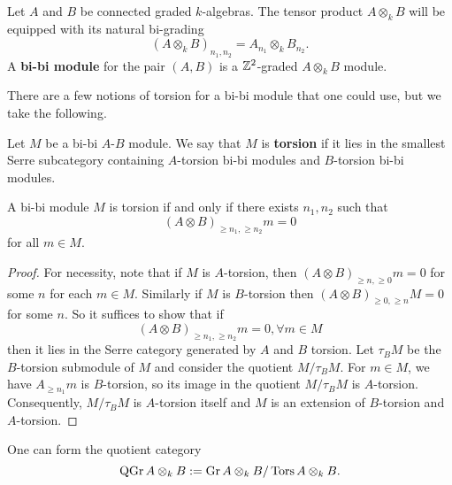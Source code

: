 \begin{definition}
  Let \(A\) and \(B\) be connected graded \(k\)-algebras. The tensor product \(A \otimes_k B\) will be equipped with its natural bi-grading 
  \begin{displaymath}
    (A \otimes_k B)_{n_1,n_2} = A_{n_1} \otimes_k B_{n_2}. 
  \end{displaymath}
  A \textbf{bi-bi module} for the pair \((A,B)\) is a \(\mathbb{Z}^2\)-graded \(A \otimes_k B\) module. 
\end{definition}

There are a few notions of torsion for a bi-bi module that one could use, but we take the following.

\begin{definition}
  Let \(M\) be a bi-bi \(A\)-\(B\) module. We say that \(M\) is \textbf{torsion} if it lies in the smallest Serre subcategory containing \(A\)-torsion bi-bi modules and \(B\)-torsion bi-bi modules.
\end{definition}

\begin{lemma} \label{lemma: alternate char of bibi torsion}
  A bi-bi module \(M\) is torsion if and only if there exists \(n_1,n_2\) such that 
  \begin{displaymath}
    (A \otimes B)_{\geq n_1, \geq n_2} m = 0
  \end{displaymath}
  for all \(m \in M\).
\end{lemma}

\begin{proof}
  For necessity, note that if \(M\) is \(A\)-torsion, then \((A \otimes B)_{\geq n, \geq 0} m = 0\) for some \(n\) for each \(m \in M\).
  Similarly if \(M\) is \(B\)-torsion then \((A \otimes B)_{\geq 0,\geq n} M = 0\) for some \(n\).
  So it suffices to show that if
  \begin{displaymath}
    (A \otimes B)_{\geq n_1, \geq n_2} m = 0 , \forall m \in M
  \end{displaymath}
  then it lies in the Serre category generated by \(A\) and \(B\) torsion. Let \(\tau_B M\) be the \(B\)-torsion submodule of \(M\) and consider the quotient \(M/\tau_B M\). For \(m \in M\), we have \(A_{\geq n_1}m\) is \(B\)-torsion, so its image in the quotient \(M/\tau_B M\) is \(A\)-torsion. Consequently, \(M / \tau_B M\) is \(A\)-torsion itself and \(M\) is an extension of \(B\)-torsion and \(A\)-torsion. 
\end{proof}

One can form the quotient category
\begin{displaymath}
  \operatorname{QGr}A \otimes_k B := \operatorname{Gr}A \otimes_k B / \operatorname{Tors}A \otimes_k B.
\end{displaymath}

